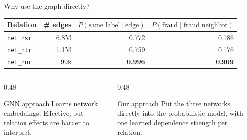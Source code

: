 \documentclass[10pt]{beamer}
\begin{document}
\begin{frame}{Why use the graph directly?}
\begin{center}
\begin{tabular}{lrrr}
\toprule
Relation & \# edges & $P(\text{same label}\mid\text{edge})$ & $P(\text{fraud}\mid\text{fraud neighbor})$ \\
\midrule
\texttt{net\_rsr} & 6.8M & 0.772 & 0.186 \\
\texttt{net\_rtr} & 1.1M & 0.759 & 0.176 \\
\texttt{net\_rur} & 99k  & \textbf{0.996} & \textbf{0.909} \\
\bottomrule
\end{tabular}
\end{center}

\vspace{0.7em}
\begin{columns}[T]
\begin{column}{0.48\textwidth}
\begin{block}{GNN approach}
Learns network embeddings. Effective, but relation effects are harder to interpret.
\end{block}
\end{column}
\begin{column}{0.48\textwidth}
\begin{alertblock}{Our approach}
Put the three networks directly into the probabilistic model, with one learned dependence strength per relation.
\end{alertblock}
\end{column}
\end{columns}
\end{frame}
\end{document}
